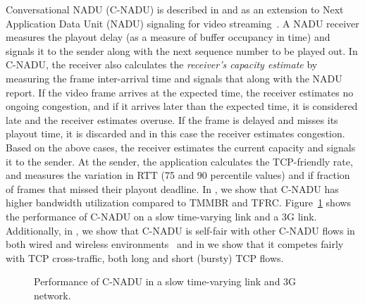 Conversational NADU (C-NADU) is described in  and
 as an extension to Next Application Data Unit (NADU)
signaling for video streaming~\cite{nadu.1070341,nadu.1530486}. A NADU
receiver measures the playout delay (as a measure of buffer occupancy in time)
and signals it to the sender along with the next sequence number to be played
out. In C-NADU, the receiver also calculates the \emph{receiver's capacity
estimate} by measuring the frame inter-arrival time and signals that along
with the NADU report. If the video frame arrives at the expected time, the
receiver estimates no ongoing congestion, and if it arrives later than the
expected time, it is considered late and the receiver estimates overuse. If
the frame is delayed and misses its playout time, it is discarded and in this
case the receiver estimates congestion. Based on the above cases, the receiver
estimates the current capacity and signals it to the sender. At the sender,
the application calculates the TCP-friendly rate, and measures the variation
in RTT (75 and 90 percentile values) and if fraction of frames that missed
their playout deadline. In , we show that C-NADU has higher
bandwidth utilization compared to TMMBR and TFRC. Figure~\ref{fig:cnadu} shows
the performance of C-NADU on a slow time-varying link and a 3G link.
Additionally, in , we show that C-NADU is self-fair with
other C-NADU flows in both wired and wireless
environments~\cite{singh:2010.thesis} and in  we show that it
competes fairly with TCP cross-traffic, both long and short (bursty) TCP
flows.

\begin{figure}
  \centerline{
  }
  \caption{Performance of C-NADU in a slow time-varying link and 3G network.}
  \label{fig:cnadu}
\end{figure}


